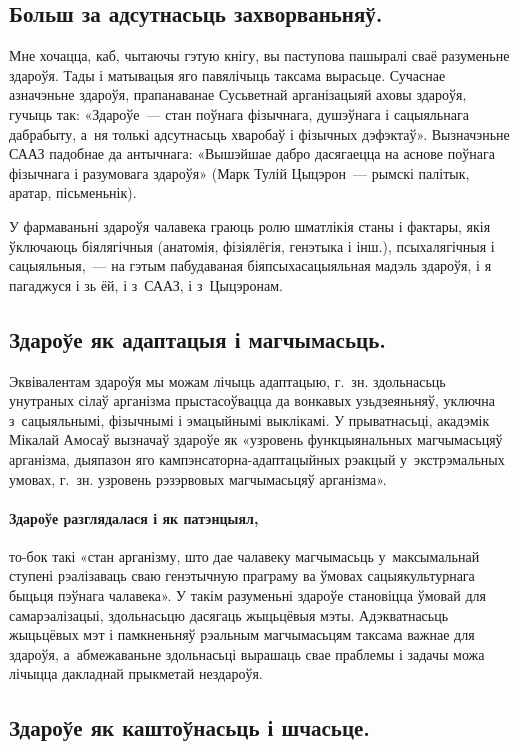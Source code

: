 \subsection*{Больш за адсутнасьць захворваньняў.} 

Мне хочацца, каб, чытаючы гэтую кнігу, вы паступова пашыралі сваё разуменьне здароўя. Тады і матывацыя яго павялічыць таксама вырасьце. Сучаснае азначэньне здароўя, прапанаванае Сусьветнай арганізацыяй аховы здароўя, гучыць так: «Здароўе~--- стан поўнага фізычнага, душэўнага і сацыяльнага дабрабыту, а~ня толькі адсутнасьць хваробаў і фізычных дэфэктаў». Вызначэньне СААЗ падобнае да антычнага: «Вышэйшае дабро дасягаецца на аснове поўнага фізычнага і разумовага здароўя» (Марк Тулій Цыцэрон~--- рымскі палітык, аратар, пісьменьнік).

У фармаваньні здароўя чалавека граюць ролю шматлікія станы і фактары, якія ўключаюць біялягічныя (анатомія, фізіялёгія, генэтыка і інш.), псыхалягічныя і сацыяльныя,~--- на гэтым пабудаваная біяпсыхасацыяльная мадэль здароўя, і я пагаджуся і зь ёй, і з~СААЗ, і з~Цыцэронам.


\subsection*{Здароўе як адаптацыя і магчымасьць.}

Эквівалентам здароўя мы можам лічыць адаптацыю, г.~зн. здольнасьць унутраных сілаў арганізма прыстасоўвацца да вонкавых узьдзеяньняў, уключна з~сацыяльнымі, фізычнымі і эмацыйнымі выклікамі. У прыватнасьці, акадэмік Мікалай Амосаў вызначаў здароўе як «узровень функцыянальных магчымасьцяў арганізма, дыяпазон яго кампэнсаторна-адаптацыйных рэакцый у~экстрэмальных умовах, г.~зн. узровень рэзэрвовых магчымасьцяў арганізма».

\paragraph{Здароўе разглядалася і як патэнцыял,} то-бок такі «стан арганізму, што дае чалавеку магчымасьць у~максымальнай ступені рэалізаваць сваю генэтычную праграму ва ўмовах сацыякультурнага быцьця пэўнага чалавека». У такім разуменьні здароўе становіцца ўмовай для самарэалізацыі, здольнасьцю дасягаць жыцьцёвыя мэты. Адэкватнасьць жыцьцёвых мэт і памкненьняў рэальным магчымасьцям таксама важнае для здароўя, а~абмежаваньне здольнасьці вырашаць свае праблемы і задачы можа лічыцца дакладнай прыкметай нездароўя.

\subsection*{Здароўе як каштоўнасьць і шчасьце.}

